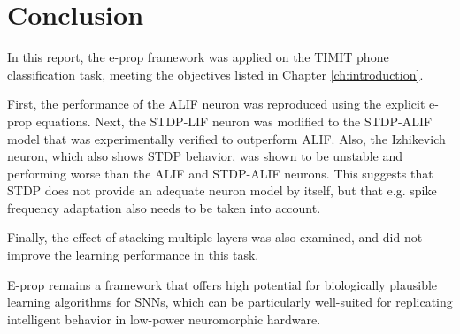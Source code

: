 \chapter{Conclusion}\label{ch:conclusion}

In this report, the e-prop framework was applied on the TIMIT phone classification task, meeting the objectives listed in Chapter \ref{ch:introduction}.

First, the performance of the ALIF neuron was reproduced using the explicit e-prop equations.
Next, the STDP-LIF neuron was modified to the STDP-ALIF model that was experimentally verified to outperform ALIF.
Also, the Izhikevich neuron, which also shows STDP behavior, was shown to be unstable and performing worse than the ALIF and STDP-ALIF neurons.
This suggests that STDP does not provide an adequate neuron model by itself, but that e.g. spike frequency adaptation also needs to be taken into account.

Finally, the effect of stacking multiple layers was also examined, and did not improve the learning performance in this task.

E-prop remains a framework that offers high potential for biologically plausible learning algorithms for SNNs, which can be particularly well-suited for replicating intelligent behavior in low-power neuromorphic hardware.
